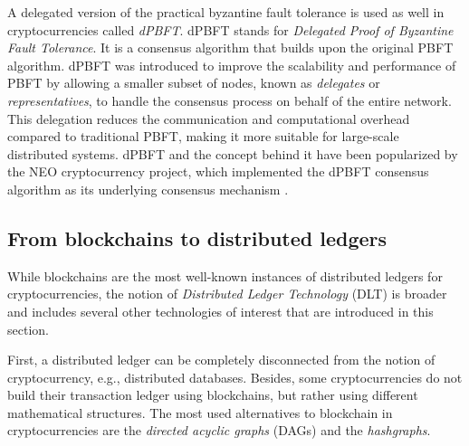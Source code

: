 A delegated version of the practical byzantine fault tolerance is used as well in cryptocurrencies called \emph{dPBFT}. dPBFT stands for \emph{Delegated Proof of Byzantine Fault Tolerance}. It is a consensus algorithm that builds upon the original PBFT algorithm. dPBFT was introduced to improve the scalability and performance of PBFT by allowing a smaller subset of nodes, known as \emph{delegates} or \emph{representatives}, to handle the consensus process on behalf of the entire network. This delegation reduces the communication and computational overhead compared to traditional PBFT, making it more suitable for large-scale distributed systems.
 dPBFT and the concept behind it have been popularized by the NEO cryptocurrency project, which implemented the dPBFT consensus algorithm as its underlying consensus mechanism \cite{Zhan2021}. 
\subsection{From blockchains to distributed ledgers}
\label{ss_blockchain_DLT}
 
 While blockchains are the most well-known instances of distributed ledgers for cryptocurrencies, the notion of \emph{Distributed Ledger Technology} (DLT) is broader and includes several other technologies of interest that are introduced in this section. 
 
 First, a distributed ledger can be completely disconnected from the notion of cryptocurrency, e.g., distributed databases. Besides, some cryptocurrencies do not build their transaction ledger using blockchains, but rather using different mathematical structures. The most used alternatives to blockchain in cryptocurrencies are the \emph{directed acyclic graphs} (DAGs) and the \emph{hashgraphs}.

